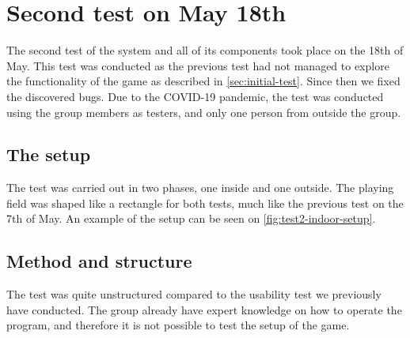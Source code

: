 \section{Second test on May 18th}
The second test of the system and all of its components took place on the 18th of May.
This test was conducted as the previous test had not managed to explore the functionality of the game as described in \autoref{sec:initial-test}.
Since then we fixed the discovered bugs.
Due to the COVID-19 pandemic, the test was conducted using the group members as testers, and only one person from outside the group.

\subsection{The setup}
The test was carried out in two phases, one inside and one outside.
The playing field was shaped like a rectangle for both tests, much like the previous test on the 7th of May.
An example of the setup can be seen on \autoref{fig:test2-indoor-setup}.

\subsection{Method and structure}
The test was quite unstructured compared to the usability test we previously have conducted.
The group already have expert knowledge on how to operate the program, and therefore it is not possible to test the setup of the game.


